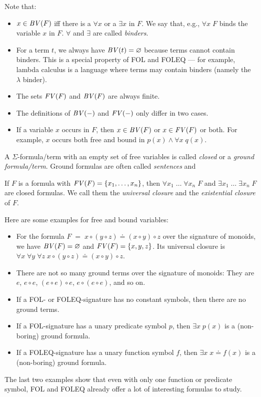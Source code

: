 \begin{remark}
Note that:
\begin{itemize}
\item $x\in\mathit{BV}(F)$ iff there is a $\forall x$ or a $\exists x$ in $F$. We say that, e.g., $\forall x \; F$ binds the variable $x$ in $F$. $\forall$ and $\exists$ are called \emph{binders}.
\item For a term $t$, we always have $\mathit{BV}(t)=\varnothing$ because terms cannot contain binders. This is a special property of FOL and FOLEQ  --- for example, lambda calculus is a language where terms may contain binders (namely the $\lambda$ binder).
\item The sets $\mathit{FV}(F)$ and $\mathit{BV}(F)$ are always finite.
\item The definitions of $\mathit{BV}(-)$ and $\mathit{FV}(-)$ only differ in two cases.
\item If a variable $x$ occurs in $F$, then $x\in\mathit{BV}(F)$ or $x\in\mathit{FV}(F)$ or both. For example, $x$ occurs both free and bound in $p(x)\wedge\forall x\;q(x)$.
\end{itemize}
\end{remark}

\begin{remark}
A $\Sigma$-formula/term with an empty set of free variables is called \emph{closed} or a \emph{ground formula/term}.
Ground formulas are often called \emph{sentences} and

If $F$ is a formula with $\mathit{FV}(F)=\{x_1,\ldots,x_n\}$, then $\forall x_1\;\ldots\;\forall x_n\;F$ and $\exists x_1\;\ldots\;\exists x_n\;F$ are closed formulas. We call them the \emph{universal closure} and the \emph{existential closure} of $F$.
\end{remark}

\begin{example}
Here are some examples for free and bound variables:
\begin{itemize}
\item For the formula $F\;=\; x\circ (y\circ z) \doteq (x\circ y)\circ z$ over the signature of monoids, we have $\mathit{BV}(F)=\varnothing$ and $\mathit{FV}(F)=\{x,y,z\}$. Its universal closure is $\forall x\;\forall y\;\forall z\;x\circ (y\circ z) \doteq (x\circ y)\circ z$.
\item There are not so many ground terms over the signature of monoids: They are $e$, $e\circ e$, $(e\circ e)\circ e$, $e\circ(e\circ e)$, and so on.
\item If a FOL- or FOLEQ-signature has no constant symbols, then there are no ground terms.
\item If a FOL-signature has a unary predicate symbol $p$, then $\exists x\;p(x)$ is a (non-boring) ground formula.
\item If a FOLEQ-signature has a unary function symbol $f$, then $\exists x\;x\doteq f(x)$ is a (non-boring) ground formula.
\end{itemize}
\end{example}
The last two examples show that even with only one function or predicate symbol, FOL and FOLEQ already offer a lot of interesting formulas to study.


